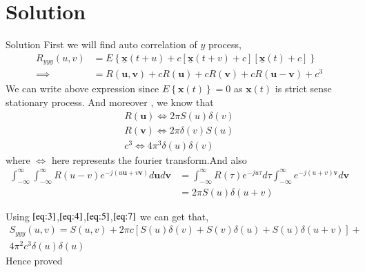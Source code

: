 \documentclass{beamer}
\providecommand{\sbrak}[1]{\ensuremath{{}\left[#1\right]}}
\providecommand{\brak}[1]{\ensuremath{\left(#1\right)}}
\providecommand{\cbrak}[1]{\ensuremath{\left\{#1\right\}}}
\begin{document}
\section{Solution}
\begin{frame}{Solution}
  		First we will find auto correlation of $y$ process,
          \begin{align}   
               R_{yyy}\brak{u,v} &= E\cbrak{ \underline{\mathbf{x}}\brak{t+u} + c \sbrak{ \underline{\mathbf{x}}\brak{t+v} + c}\sbrak{\underline{\mathbf{x}}\brak{t}+c}}\\ 
                        \implies        &= R\brak{\mathbf{u},\mathbf{v}} + cR\brak{\mathbf{u}} + cR\brak{\mathbf{v}} + cR\brak{\mathbf{u}-\mathbf{v}} + c^{3}      
          \end{align}
        We can write above expression since $ E\cbrak{\mathbf{x}\brak{t}} = 0$ as $\mathbf{x}\brak{t}$ is strict sense stationary process. And moreover , we know that
          \begin{align}
                 R\brak{\mathbf{u}} \iff 2\pi S\brak{u}\delta\brak{v}\label{eq:3}\\
                 R\brak{\mathbf{v}} \iff 2\pi \delta\brak{v}S\brak{u}\label{eq:4}\\
                 c^{3}      \iff 4\pi^{3}\delta\brak{u}\delta\brak{v} \label{eq:5}
           \end{align}
     where $\iff$ here represents the fourier transform.And also
          \begin{align}
             \int_{-\infty}^{\infty}\int_{-\infty}^{\infty}R\brak{u-v}e^{-j\brak{u\mathbf{u} + v\mathbf{v}}}d\mathbf{u}d\mathbf{v} &= \int_{-\infty}^{\infty}R\brak{\tau}e^{-ju \tau}d\tau\int_{-\infty}^{\infty}e^{-j\brak{u+v}\mathbf{v}}d\mathbf{v}\\
                                            &= 2\pi S\brak{u}\delta\brak{u+v}\label{eq:7}
          \end{align}
  \end{frame}
  \begin{frame}
    Using $\eqref{eq:3}$,$\eqref{eq:4}$,$\eqref{eq:5}$,$\eqref{eq:7}$ we can get that,
      \begin{align}
            S_{yyy}\brak{u,v} = S\brak{u,v} + 2\pi c\sbrak{S\brak{u}\delta\brak{v} + S\brak{v}\delta\brak{u}+ S\brak{u}\delta\brak{u+v}} + \nonumber\\4\pi^{2}c^{3}\delta\brak{u}\delta\brak{u}
        \end{align}
  Hence proved
   \end{frame}
\end{document}
